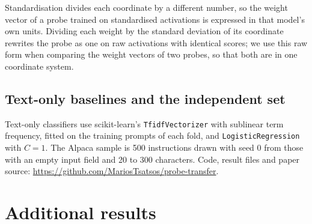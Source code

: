\documentclass[10pt]{article}
\begin{document}
Standardisation divides each coordinate by a different number, so the weight vector of a probe trained on standardised activations is expressed in that model's own units. Dividing each weight by the standard deviation of its coordinate rewrites the probe as one on raw activations with identical scores; we use this raw form when comparing the weight vectors of two probes, so that both are in one coordinate system.

\subsection{Text-only baselines and the independent set}
Text-only classifiers use scikit-learn's \texttt{TfidfVectorizer} with sublinear term frequency, fitted on the training prompts of each fold, and \texttt{LogisticRegression} with $C = 1$. The Alpaca sample is 500 instructions drawn with seed 0 from those with an empty input field and 20 to 300 characters. Code, result files and paper source: \url{https://github.com/MariosTsatsos/probe-transfer}.

\section{Additional results}
\label{app:results}
\setcounter{figure}{0}\setcounter{table}{0}

\begin{table}[ht]
\centering
\small
{}
\caption{XSTest, per-fold layer choice. AUCs are means over the 8 held-out prompt-type folds. ``Transferred'': the base model's probe applied unchanged to the successor. ``Change'': transferred minus base, per fold, mean $\pm$ nominal 95\% interval (Student's $t$, 7 degrees of freedom). ``Own probe'': a probe trained on the successor. ``Angle'': rotation of the safety direction, mean over folds.}
\label{tab:xstest-full}
\end{table}
\end{document}
